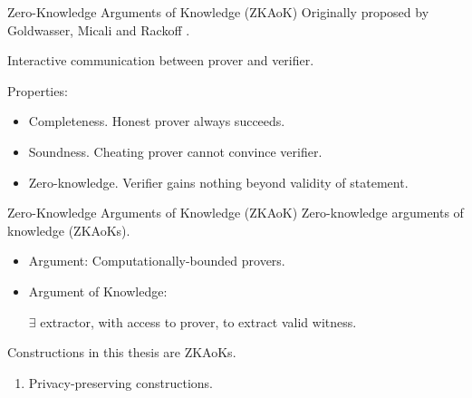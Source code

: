 \begin{frame}{Zero-Knowledge Arguments of Knowledge (ZKAoK)}
	Originally proposed by Goldwasser, Micali and Rackoff \cite{GoldwasserMR85}.\pause
	
	Interactive communication between prover and verifier.\pause
	
	Properties:\pause
	\begin{itemize}
		\item {\small Completeness. Honest prover always succeeds.}\pause
		\item {\small Soundness. Cheating prover cannot convince verifier.}\pause
		\item {\small Zero-knowledge. Verifier gains nothing beyond validity of statement.}\pause
	\end{itemize}

	
\end{frame}

\begin{frame}{Zero-Knowledge Arguments of Knowledge (ZKAoK)}
	Zero-knowledge arguments of knowledge (ZKAoKs).\pause
	\begin{itemize}
		\item Argument: Computationally-bounded provers.\pause
		\item Argument of Knowledge: 
		
		$\exists$ extractor, with access to prover, to extract valid witness.\pause
	\end{itemize}

	Constructions in this thesis are ZKAoKs.\pause
	\begin{enumerate}[$\Rightarrow$]
		\item Privacy-preserving constructions.
	\end{enumerate}
\end{frame}